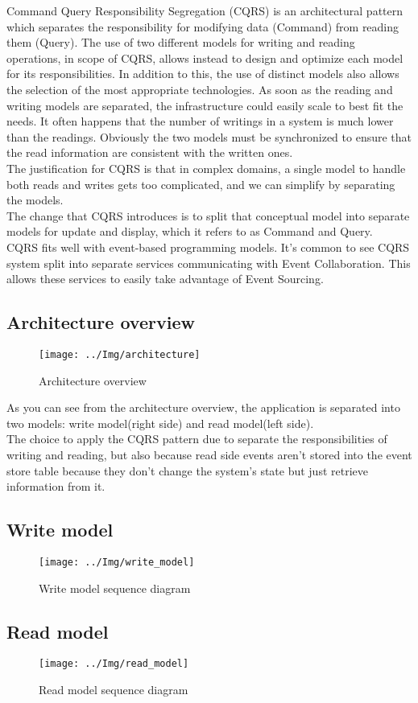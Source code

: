 \newpage
{}
Command Query Responsibility Segregation (CQRS) is an architectural pattern which separates the responsibility for modifying data (Command) from reading them (Query). The use of two different models for writing and reading operations, in scope of CQRS, allows instead to design and optimize each model for its responsibilities. In addition to this, the use of distinct models also allows the selection of the most appropriate technologies. As soon as the reading and writing models are separated, the infrastructure could easily scale to best fit the needs. It often happens that the number of writings in a system is much lower than the readings. Obviously the two models must be synchronized to ensure that the read information are consistent with the written ones.\\
The justification for CQRS is that in complex domains, a single model to handle both reads and writes gets too complicated, and we can simplify by separating the models.\\
The change that CQRS introduces is to split that conceptual model into separate models for update and display, which it refers to as Command and Query.\\
CQRS fits well with event-based programming models. It's common to see CQRS system split into separate services communicating with Event Collaboration. This allows these services to easily take advantage of Event Sourcing.


\subsection{Architecture overview}
\begin{figure} [H]
	\centering
	\texttt{[image: ../Img/architecture]}
	\caption{Architecture overview}\label{}
\end{figure}
As you can see from the architecture overview, the application is separated into two models: write model(right side) and read model(left side). \\
The choice to apply the CQRS pattern due to separate the responsibilities of writing and reading, but also because read side events aren't stored into the event store table because they don't change the system's state but just retrieve information from it.


\subsection{Write model}
\begin{figure} [H]
	\texttt{[image: ../Img/write\_model]}
	\caption{Write model sequence diagram}\label{}
\end{figure}

\subsection{Read model}
\begin{figure} [H]
	\centering
	\texttt{[image: ../Img/read\_model]}
	\caption{Read model sequence diagram}\label{}
\end{figure}
